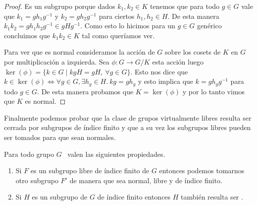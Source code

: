 \documentclass[tesis.tex]{subfiles}
\begin{document}
\begin{proof}
	Es un subgrupo porque dados $k_{1}, k_{2} \in K$ tenemos que para todo $g \in G$ vale que $k_{1} = gh_{1}g^{-1}$ y $k_{2} = gh_{2}g^{-1}$ para ciertos $h_{1},h_{2} \in H$.
	De esta manera $k_{1}k_{2} = g h_{1}h_{2}g^{-1} \in gHg^{-1}$. 
	Como esto lo hicimos para un $g \in G$ genérico concluimos que $k_{1}k_{2} \in K$ tal como queríamos ver.
	
	Para ver que es normal consideramos la acción de $G$ sobre los cosets de $K$ en $G$ por multiplicación a izquierda.
	Sea $\phi:G \to G/K$ esta acción luego $\ker(\phi) = \{  k \in G \mid kgH = gH, \ \forall g \in G \}$. 
	Esto nos dice que $k \in \ker(\phi) \iff \forall g \in G, \exists h_{g} \in H. \ kg = gh_{g}$ y esto implica que $k = gh_{g}g^{-1}$ para todo $g \in G$.
	De esta manera probamos que $K = \ker(\phi)$ y por lo tanto vimos que $K$ es normal.
\end{proof}

Finalmente podemos probar que la clase de grupos virtualmente libres resulta ser cerrada por subgrupos de índice finito y que a su vez los subgrupos libres pueden ser tomados para que sean normales.

\begin{prop}\label{prop_vls}
	Para todo grupo $G$ \vl \ valen las siguientes propiedades.
	\begin{enumerate}
		\item Si $F$ es un subgrupo libre de índice finito de $G$ entonces podemos tomarnos otro subgrupo $F'$ de manera que sea normal, libre y de índice finito.
		\item Si $H$ es un subgrupo de $G$ de índice finito entonces $H$ también resulta ser \vl.
	\end{enumerate}
\end{prop}
\end{document}
